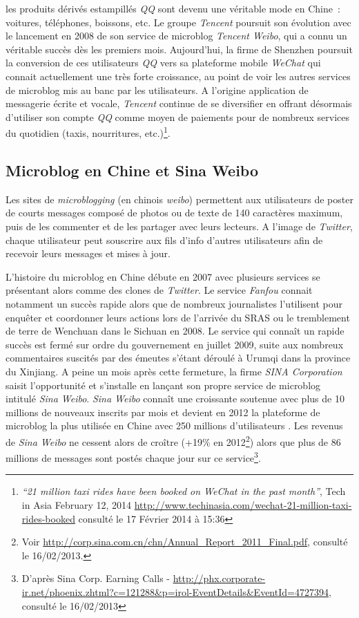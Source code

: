 les produits dérivés estampillés \textit{QQ} sont devenu une véritable mode en Chine : voitures, téléphones, boissons, etc. Le groupe \textit{Tencent} poursuit son évolution avec le lancement en 2008 de son service de microblog \textit{Tencent Weibo}, qui a connu un véritable succès dès les premiers mois. Aujourd’hui, la firme de Shenzhen poursuit la conversion de ces utilisateurs \textit{QQ} vers sa plateforme mobile \textit{WeChat} qui connait actuellement une très forte croissance, au point de voir les autres services de microblog mis au banc par les utilisateurs. A l’origine application de messagerie écrite et vocale, \textit{Tencent} continue de se diversifier en offrant désormais d’utiliser son compte \textit{QQ} comme moyen de paiements pour de nombreux services du quotidien (taxis, nourritures, etc.)\footnote{\textit{“21 million taxi rides have been booked on WeChat in the past month”}, Tech in Asia February 12, 2014 \url{http://www.techinasia.com/wechat-21-million-taxi-rides-booked} consulté le 17 Février 2014 à 15:36}.

\subsection[Microblog en Chine et Sina Weibo]{Microblog en Chine et Sina Weibo}
Les sites de \textit{microblogging} (en chinois \textit{weibo}) permettent aux utilisateurs de poster de courts messages composé de photos ou de texte de 140 caractères maximum, puis de les commenter et de les partager avec leurs lecteurs. A l’image de \textit{Twitter}, chaque utilisateur peut souscrire aux fils d’info d’autres utilisateurs afin de recevoir leurs messages et mises à jour.

L’histoire du microblog en Chine débute en 2007 avec plusieurs services se présentant alors comme des clones de \textit{Twitter}. Le service \textit{Fanfou} connait notamment un succès rapide alors que de nombreux journalistes l’utilisent pour enquêter et coordonner leurs actions lors de l’arrivée du SRAS ou le tremblement de terre de Wenchuan dans le Sichuan en 2008. Le service qui connaît un rapide succès est fermé sur ordre du gouvernement en juillet 2009, suite aux nombreux commentaires suscités par des émeutes s’étant déroulé à Urumqi dans la province du Xinjiang. A peine un mois après cette fermeture, la firme \textit{SINA Corporation} saisit l’opportunité et s’installe en lançant son propre service de microblog intitulé \textit{Sina Weibo}. \textit{Sina Weibo} connaît une croissante soutenue avec plus de 10 millions de nouveaux inscrits par mois et devient en 2012 la plateforme de microblog la plus utilisée en Chine avec 250 millions d’utilisateurs \citep{McKinsey2012}. Les revenus de \textit{Sina Weibo} ne cessent alors de croître (+19\% en 2012\footnote{Voir \url{http://corp.sina.com.cn/chn/Annual_Report_2011_Final.pdf}, consulté le 16/02/2013.}) alors que plus de 86 millions de messages sont postés chaque jour sur ce service\footnote{D’après Sina Corp. Earning Calls - \url{http://phx.corporate-ir.net/phoenix.zhtml?c=121288&p=irol-EventDetails&EventId=4727394}, consulté le 16/02/2013}. 


